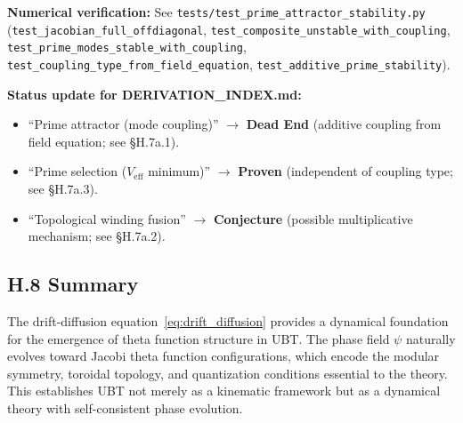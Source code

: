 \textbf{Numerical verification:} See \texttt{tests/test\_prime\_attractor\_stability.py}
(\texttt{test\_jacobian\_full\_offdiagonal}, \texttt{test\_composite\_unstable\_with\_coupling},
\texttt{test\_prime\_modes\_stable\_with\_coupling}, \texttt{test\_coupling\_type\_from\_field\_equation},
\texttt{test\_additive\_prime\_stability}).

\textbf{Status update for DERIVATION\_INDEX.md:}
\begin{itemize}
  \item ``Prime attractor (mode coupling)'' $\to$ \textbf{Dead End} (additive coupling from field equation; see §H.7a.1).
  \item ``Prime selection ($V_{\mathrm{eff}}$ minimum)'' $\to$ \textbf{Proven} (independent of coupling type; see §H.7a.3).
  \item ``Topological winding fusion'' $\to$ \textbf{Conjecture} (possible multiplicative mechanism; see §H.7a.2).
\end{itemize}

\subsection*{H.8 Summary}

The drift-diffusion equation~\eqref{eq:drift_diffusion} provides a dynamical foundation for the emergence of theta function structure in UBT. The phase field $\psi$ naturally evolves toward Jacobi theta function configurations, which encode the modular symmetry, toroidal topology, and quantization conditions essential to the theory. This establishes UBT not merely as a kinematic framework but as a dynamical theory with self-consistent phase evolution.
